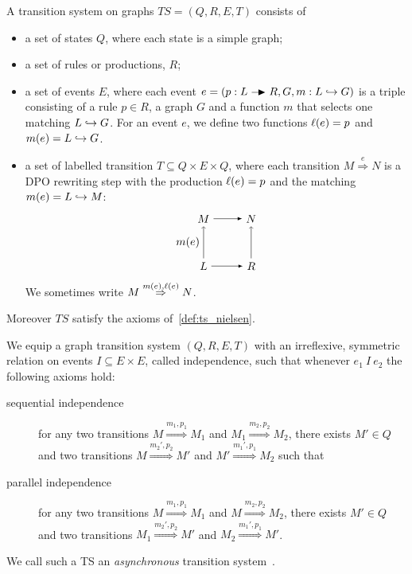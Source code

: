 \begin{definition}[TS on graphs]
  A transition system on graphs $TS = (Q,R,E,T)$ consists of
  \begin{itemize}
  \item a set of states $Q$, where each state is a simple graph;
  \item a set of rules or productions, $R$;
  \item a set of events $E$, where each event $e=(p:L\action R,G,m:L\emb G)$ is a triple consisting of a rule $p\in R$, a graph $G$ and a function $m$ that selects one matching $L\hookrightarrow G$. For an event $e$, we define two functions $\ell(e) = p$ and $m(e) = L\hookrightarrow G$.
  \item a set of labelled transition $T\subseteq Q\times E\times Q$, where each transition $M \overset{e}{\Rightarrow} N$ is a DPO rewriting step with the production $\ell(e) = p$ and the matching $m(e) = L\hookrightarrow M$:
    \[
    \begin{tikzpicture} %
      \node (l) at (-1.5,0) {\(L\)};
      \node (r) at (0,0) {\(R\)};
      \node (m) at (-1.5,1.5) {\(M\)};
      \node (n) at (0,1.5) {\(N\)};
      \draw [->] (l) -- node [left,midway] {\(m(e)\)}  (m);
      \draw [>=latex, ->] (l) -- (r);
      \draw [>=latex, ->] (m) -- (n);
      \draw [->] (r) -- (n);
    \end{tikzpicture}
    \]
    We sometimes write $M\overset{m(e),\ell(e)}{\Rightarrow} N$.
  \end{itemize}
  Moreover $TS$ satisfy the axioms of~\autoref{def:ts_nielsen}.
\end{definition}


\begin{definition}
  We equip a graph transition system $(Q,R,E,T)$ with an irreflexive, symmetric relation on events $I\subseteq E\times E$, called independence, such that whenever $e_1~I~e_2$ the following axioms hold:
  \begin{description}
  \item[sequential independence]
    for any two transitions $M\overset{m_1,p_1}{\Rightarrow} M_1$ and $M_1\overset{m_2,p_2}{\Rightarrow} M_2$, there exists $M'\in Q$ and two transitions $M\overset{m_2',p_2}{\Rightarrow} M'$ and $M'\overset{m_1',p_1}{\Rightarrow} M_2$ such that  %
  \item[parallel independence]
    for any two transitions $M\overset{m_1,p_1}{\Rightarrow} M_1$ and $M\overset{m_2,p_2}{\Rightarrow} M_2$, there exists $M'\in Q$ and two transitions $M_1\overset{m_2',p_2}{\Rightarrow} M'$ and $M_2\overset{m_1',p_1}{\Rightarrow} M'$. %
  \end{description}
  We call such a TS an \emph{asynchronous} transition system~\cite{Mukund93}.
\end{definition}

